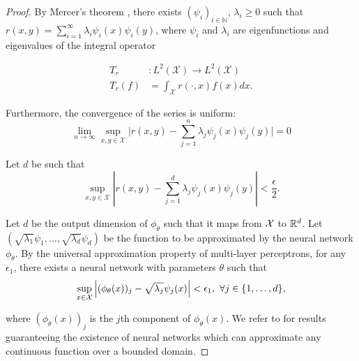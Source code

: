 \begin{proof}
	\hphantom{~}

	By Mercer's theorem \parencite{mercerFunctionsPositive1909, sunMercerTheorem2005, micchelliUniversalKernels2006}, there exists \((\psi_i)_{i \in \mathbb{N}}\), \(\lambda_i \geq 0\) such that \(r(x,y) = \sum_{i=1}^{\infty}{\lambda_i \psi_i(x) \psi_i(y)}\), where \(\psi_i\) and \(\lambda_i\) are eigenfunctions and eigenvalues of the integral operator

	\begin{align*}
		T_r&: L^2(\mathcal{X}) \to L^2(\mathcal{X}) \\
		T_r(f) &= \int_{\mathcal{X}}{r(\cdot, x) f(x) dx}.
	\end{align*}

	Furthermore, the convergence of the series is uniform:
	\begin{equation}
		\lim_{n \to \infty} \sup_{x,y \in \mathcal{X}} \lvert r(x,y) - \sum_{j=1}^{n}{\lambda_j \psi_j(x) \psi_j(y) \rvert} = 0
	\end{equation}

	Let \(d\) be such that
	\begin{equation}
		\label{eq:proof_mercer_thm_unif_abs_cv}
		\sup_{x,y \in \mathcal{X}} \left\lvert r(x,y) - \sum_{j=1}^{d}{\lambda_j \psi_j(x) \psi_j(y)} \right\rvert < \frac{\epsilon}{2}.
	\end{equation}

	Let $d$ be the output dimension of \(\phi_\theta\) such that it maps from ${\mathcal{X}}$ to $\mathbb{R}^d$. Let \((\sqrt{\lambda_1} \psi_1, \ldots, \sqrt{\lambda_{d}} \psi_{d})\) be the function to be approximated by the neural network \(\phi_\theta\). By the universal approximation property of multi-layer perceptrons, for any \(\epsilon_1\), there exists a neural network with parameters \(\theta\) such that
	\begin{equation}
		\label{eq:proof_NN_UAP}
		\sup_{x\in \mathcal{X}}{\left\lvert(\phi_\theta(x))_j - \sqrt{\lambda_j} \psi_j(x)\right\rvert} < \epsilon_1, \ \forall j \in \{1, \ldots, d\},
	\end{equation}

    \noindent where $(\phi_\theta(x))_j$ is the \(j\)th component of $\phi_\theta(x)$. We refer to \parencite{hornikMultilayerFeedforward1989, cybenkoApproximationSuperpositions1989, barronUniversalApproximation1993} for results guaranteeing the existence of neural networks which can approximate any continuous function over a bounded domain.


\end{proof}
